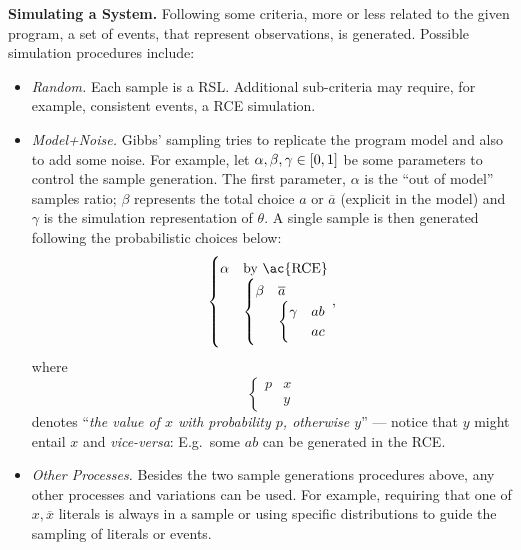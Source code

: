 \documentclass[a4paper, 10pt]{article}
\newcommand{\co}[1]{\ensuremath{\overline{#1}}}
\begin{document}
\bigskip\noindent\textbf{Simulating a System.} Following some criteria, more or less related to the given program, a set of events, that represent observations, is generated. Possible simulation procedures include:
\begin{itemize}
    \item \emph{Random.} Each sample is a \ac{RSL}. Additional sub-criteria may require, for example, consistent events, a \ac{RCE} simulation.
    \item \emph{Model+Noise.} Gibbs' sampling \cite{geman84} tries to replicate the program model and also to add some noise. For example, let $\alpha, \beta, \gamma \in \intcc{0,1}$ be some parameters to control the sample generation. The first parameter, $\alpha$ is the ``out of model'' samples ratio; $\beta$ represents the total choice $a$ or $\co{a}$ (explicit in the model) and $\gamma$ is the simulation representation of $\theta$. A single sample is then generated following the probabilistic choices below:
          $$
              \begin{cases}
                  \alpha & \text{by \ac{RCE}} \\%
                         &
                  \begin{cases}
                      \beta & \co{a} \\%
                            &
                      \begin{cases}
                          \gamma & ab \\%
                                 & ac
                      \end{cases}
                  \end{cases}
              \end{cases},
          $$
          where
          $$
              \begin{cases}
                  p & x \\%
                    & y
              \end{cases}
          $$
          denotes ``\emph{the value of $x$ with probability $p$, otherwise $y$}'' --- notice that $y$ might entail $x$ and \emph{vice-versa}: E.g.\ some $ab$ can be generated in the \ac{RCE}.
    \item \emph{Other Processes.} Besides the two sample generations procedures above, any other processes and variations can be used. For example, requiring that one of $x, \co{x}$ literals is always in a sample or using specific distributions to guide the sampling of literals or events.
\end{itemize}
\end{document}
